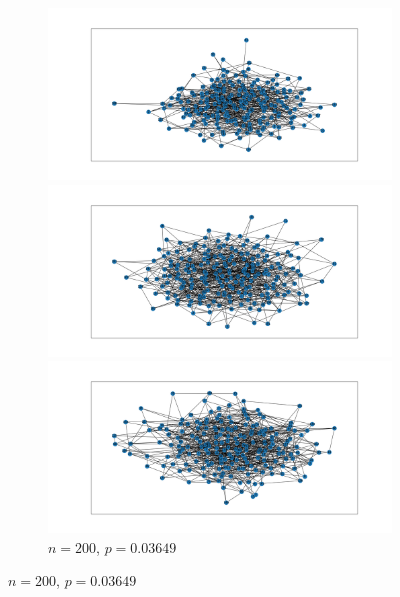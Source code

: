 \documentclass{article}
\begin{document}
\begin{figure}[htb]
    \par\bigskip

    \begin{subfigure}{\textwidth}
        \centering
        \begin{minipage}{0.32\textwidth}
            \centering
            \includegraphics[width=\linewidth]{images/erdos_renyi/n200_p0.03649158683274018_0.png}
        \end{minipage}\hfill
        \begin{minipage}{0.32\textwidth}
            \centering
            \includegraphics[width=\linewidth]{images/erdos_renyi/n200_p0.03649158683274018_1.png}
        \end{minipage}\hfill
        \begin{minipage}{0.32\textwidth}
            \centering
            \includegraphics[width=\linewidth]{images/erdos_renyi/n200_p0.03649158683274018_2.png}
        \end{minipage}
        \caption{$n=200$, $p=0.03649$}
    \end{subfigure}


\end{figure}
\end{document}
